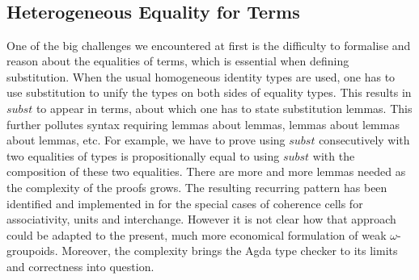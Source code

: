 \documentclass{acm_proc_article-sp}
\newcommand{\wog}{weak $\omega$-groupoids}
\begin{document}
\begin{code}\>\<%
\\
\>   \<%
\\
\>[0]\<[2]%
\>[2]\AgdaInductiveConstructor{*} \<[8]%
\>[8]\AgdaSymbol{:}  \<%
\\
\>[0]\<[2]%
\>[2] \<[8]%
\>[8]\AgdaSymbol{:} \AgdaSymbol{\{} \AgdaSymbol{:}  \AgdaSymbol{\}(}  \AgdaSymbol{:}  \AgdaSymbol{)}   \<%
\\
\>\<\end{code}

\subsection{Heterogeneous Equality for Terms}

One of the big challenges we encountered at first is the difficulty to
formalise and reason about the equalities of terms, which is
essential when defining substitution.  When the usual homogeneous identity types
are used, one has to use substitution to unify
the types on both sides of equality types. This results in
$\mathit{subst}$ to appear in terms, about which one has to state
substitution lemmas. This further pollutes syntax requiring lemmas
about lemmas, lemmas about lemmas about lemmas, etc. For example, we have to prove using $\mathit{subst}$ consecutively with two equalities of types is propositionally equal to using $\mathit{subst}$ with the composition of these two equalities. There are more and more lemmas needed as the complexity of the proofs grows. The resulting
recurring pattern has been identified and implemented in
\cite{txa:csl} for the special cases of coherence cells for
associativity, units and interchange. However it is not clear how that
approach could be adapted to the present, much more economical
formulation of {\wog}. Moreover, the complexity brings the
Agda type checker to its limits and correctness into question.
\end{document}
